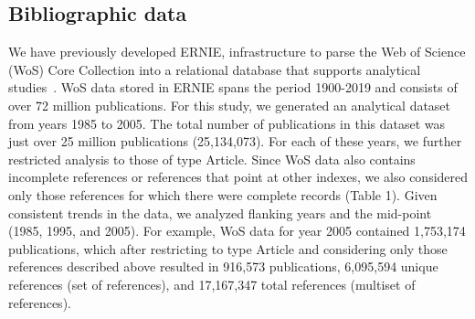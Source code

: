 \documentclass[NETN]{stjour}
\begin{document}
\subsection{Bibliographic data} We have previously developed ERNIE, infrastructure to parse the Web of Science (WoS) Core Collection into a relational database that supports analytical studies~\cite{Keserci371955}. WoS data stored in ERNIE spans the period 1900-2019 and consists of over 72 million publications. For this study, we generated an analytical dataset from years 1985 to 2005. The total number of publications in this dataset was just over 25 million publications (25,134,073).  For each of these years, we further restricted analysis to those of type Article. Since WoS data also contains incomplete references or references that point at other indexes,  we also considered only those references for which there were complete records (Table 1). Given consistent trends in the data, we analyzed flanking years and the mid-point (1985, 1995, and 2005). For example, WoS data for year 2005 contained 1,753,174 publications, which after restricting to type Article and considering only those references described above resulted in 916,573 publications, 6,095,594 unique references (set of references), and 17,167,347 total references (multiset of references). 
\end{document}
